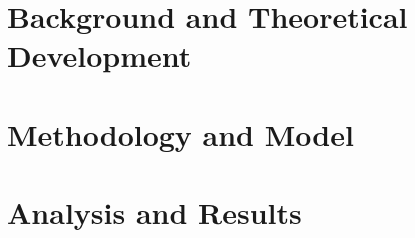 

\part{Background and Theoretical Development} \label{part-background}






\part{Methodology and Model} \label{part-model}



\part{Analysis and Results} \label{part-analysis}


% 
% 
